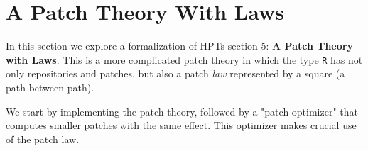 \section{A Patch Theory With Laws}\label{sec/laws-noTrunc-noIndep}

In this section we explore a formalization of HPTs section 5: \textbf{A Patch Theory with Laws}.
This is a more complicated patch theory in which the type \texttt{R} has not only repositories
and patches, but also a patch \emph{law} represented by a square (a path between path).

We start by implementing the patch theory, followed by a "patch optimizer" that computes
smaller patches with the same effect. This optimizer makes crucial use of the patch law.

\begin{code}[hide]%
\>[0]\AgdaSymbol{\{-\#}\AgdaSpace{}%
\AgdaSpace{}%
\AgdaSpace{}%
\AgdaSymbol{\#-\}}\<%
\\
%
\\[\AgdaEmptyExtraSkip]%
\>[0]\AgdaSpace{}%
\AgdaSpace{}%
\<%
\\
%
\\[\AgdaEmptyExtraSkip]%
\>[0]\AgdaSpace{}%
\AgdaSpace{}%
\AgdaSpace{}%
\<%
\\
\>[0][@{}l@{\AgdaIndent{0}}]%
\>[2]\AgdaSymbol{(}%
\>[13]\AgdaSymbol{;}\AgdaSpace{}%
\AgdaOperator{\AgdaFunction{\#\AgdaUnderscore{}}}\AgdaSpace{}%
\AgdaSymbol{;}\AgdaSpace{}%
\AgdaSpace{}%
\AgdaSymbol{;}\AgdaSpace{}%
\AgdaSymbol{)}\<%
\\
\>[0]\AgdaSpace{}%
\AgdaSpace{}%
\<%
\\
\>[0][@{}l@{\AgdaIndent{0}}]%
\>[2]\AgdaSymbol{(}\AgdaSpace{}%
\AgdaSymbol{;}\AgdaSpace{}%
\AgdaSpace{}%
\AgdaSymbol{;}\AgdaSpace{}%
\AgdaOperator{\AgdaFunction{\AgdaUnderscore{}==\AgdaUnderscore{}}}\AgdaSymbol{)}\<%
\\
\>[0]\AgdaSpace{}%
\AgdaSpace{}%
\AgdaSpace{}%
\<%
\\
\>[0][@{}l@{\AgdaIndent{0}}]%
\>[2]\AgdaSymbol{(}\AgdaSpace{}%

\end{code}
